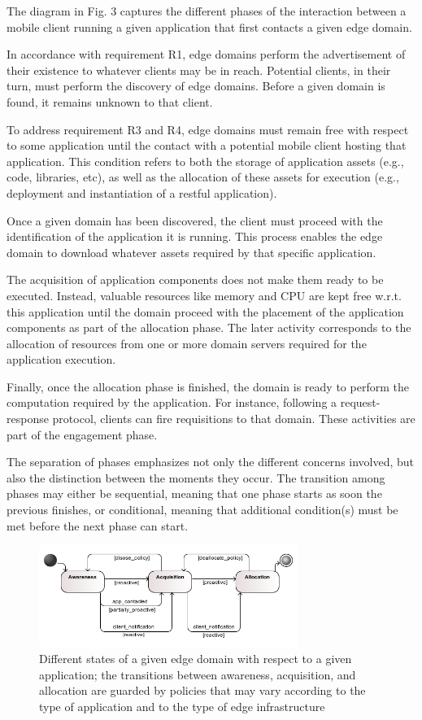 The diagram in Fig. 3 captures the different phases of the interaction between a mobile client running a given application that first contacts a given edge domain. 
	
In accordance with requirement R1, edge domains perform the advertisement of their existence to whatever clients may be in reach. Potential clients, in their turn, must perform the discovery of edge domains. Before a given domain is found, it remains unknown to that client.

To address requirement R3 and R4, edge domains must remain free with respect to some application until the contact with a potential mobile client hosting that application. This condition refers to both the storage of application assets (e.g., code, libraries, etc), as well as the allocation of these assets for execution (e.g., deployment and instantiation of a restful application). 

Once a given domain has been discovered, the client must proceed with the identification of the application it is running. This process enables the edge domain to download whatever assets required by that specific application.  

The acquisition of application components does not make them ready to be executed. Instead, valuable resources like memory and CPU are kept free w.r.t. this application until the domain proceed with the placement of the application components as part of the allocation phase. The later activity corresponds to the allocation of resources from one or more domain servers required for the application execution. 	

Finally, once the allocation phase is finished, the domain is ready to perform the computation required by the application. For instance, following a request-response protocol, clients can fire requisitions to that domain. These activities are part of the engagement phase.

The separation of phases emphasizes not only the different concerns involved, but also the distinction between the moments they occur. The transition among phases may either be sequential, meaning that one phase starts as soon the previous finishes, or conditional, meaning that additional condition(s) must be met before the next phase can start. 	

\begin{figure}
  \includegraphics[width=0.75\textwidth]{figs/states.png}
  \caption{Different states of a given edge domain with respect to a given application; the transitions between awareness, acquisition, and allocation are guarded by policies that may vary according to the type of application and to the type of edge infrastructure}
  \label{fig:states}
\end{figure}

